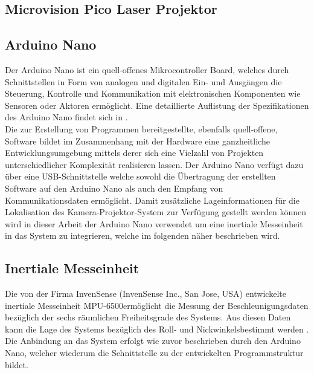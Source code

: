 
\subsection{Microvision Pico Laser Projektor}

\subsection{Arduino Nano}
\label{chap.arduino}
Der Arduino Nano ist ein quell-offenes Mikrocontroller Board, welches durch Schnittstellen in Form von analogen und digitalen Ein- und Ausgängen die Steuerung, Kontrolle und Kommunikation mit elektronischen Komponenten wie Sensoren oder Aktoren ermöglicht. Eine detaillierte Auflistung der Spezifikationen des Arduino Nano findet sich in .\\
Die zur Erstellung von Programmen bereitgestellte, ebenfalls quell-offene, Software bildet im Zusammenhang mit der Hardware eine ganzheitliche Entwicklungsumgebung mittels derer sich eine Vielzahl von Projekten unterschiedlicher Komplexität realisieren lassen. Der Arduino Nano verfügt dazu über eine USB-Schnittstelle welche sowohl die Übertragung der erstellten Software auf den Arduino Nano als auch den Empfang von Kommunikationsdaten ermöglicht. Damit zusätzliche Lageinformationen für die Lokalisation des Kamera-Projektor-System zur Verfügung gestellt werden können wird in dieser Arbeit der Arduino Nano verwendet um eine inertiale Messeinheit in das System zu integrieren, welche im folgenden näher beschrieben wird.
\\


\subsection{Inertiale Messeinheit}
\label{chap.imu}
Die von der Firma InvenSense (InvenSense Inc., San Jose, USA) entwickelte inertiale Messeinheit MPU-6500\texttrademark \space ermöglicht die Messung der Beschleunigungsdaten bezüglich der sechs räumlichen Freiheitsgrade des Systems. Aus diesen Daten kann die Lage des Systems bezüglich des Roll- und Nickwinkels\red[footnote] bestimmt werden \cite{IMU}. Die Anbindung an das System erfolgt wie zuvor beschrieben durch den Arduino Nano, welcher wiederum die Schnittstelle zu der entwickelten Programmstruktur bildet.

